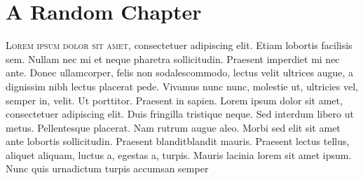 \chapter{A Random Chapter}

\lettrine{L}{orem ipsum dolor sit amet}, consectetuer adipiscing elit. Etiam lobortis facilisis sem. Nullam nec mi et neque pharetra sollicitudin. Praesent imperdiet mi nec ante.  Donec ullamcorper, felis non sodalescommodo, lectus velit ultrices augue, a dignissim nibh lectus placerat pede. Vivamus nunc nunc, molestie ut, ultricies vel, semper in, velit. Ut porttitor. Praesent in sapien. Lorem ipsum dolor sit amet, consectetuer adipiscing elit. Duis fringilla tristique neque. Sed interdum libero ut metus. Pellentesque placerat. Nam rutrum augue aleo. Morbi sed elit sit amet ante lobortis sollicitudin. Praesent blanditblandit mauris. Praesent lectus tellus, aliquet aliquam, luctus a, egestas a, turpis. Mauris lacinia lorem sit amet ipsum. Nunc quis urnadictum turpis accumsan semper